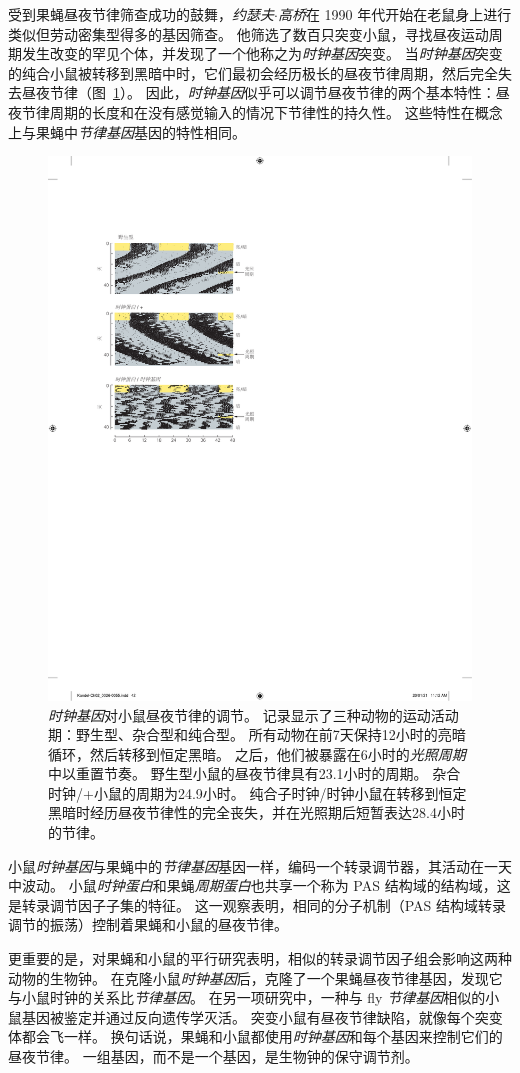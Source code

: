 受到果蝇昼夜节律筛查成功的鼓舞，\textit{约瑟夫$\cdot$高桥}在 1990 年代开始在老鼠身上进行类似但劳动密集型得多的基因筛查。
他筛选了数百只突变小鼠，寻找昼夜运动周期发生改变的罕见个体，并发现了一个他称之为\textit{时钟基因}突变。
当\textit{时钟基因}突变的纯合小鼠被转移到黑暗中时，它们最初会经历极长的昼夜节律周期，然后完全失去昼夜节律（图~\ref{fig:2_12}）。
因此，\textit{时钟基因}似乎可以调节昼夜节律的两个基本特性：昼夜节律周期的长度和在没有感觉输入的情况下节律性的持久性。
这些特性在概念上与果蝇中\textit{节律基因}基因的特性相同。


\begin{figure}[htbp]
	\centering
	\includegraphics[width=0.55\linewidth]{chap02/fig_2_12}
	\caption{\textit{时钟基因}对小鼠昼夜节律的调节。
		记录显示了三种动物的运动活动期：野生型、杂合型和纯合型。
		所有动物在前7天保持12小时的亮暗循环，然后转移到恒定黑暗。
		之后，他们被暴露在6小时的\textit{光照周期}中以重置节奏。
		野生型小鼠的昼夜节律具有23.1小时的周期。
		杂合时钟/+小鼠的周期为24.9小时。
		纯合子时钟/时钟小鼠在转移到恒定黑暗时经历昼夜节律性的完全丧失，并在光照期后短暂表达28.4小时的节律\cite{takahashi1994forward}。}
	\label{fig:2_12}
\end{figure}


小鼠\textit{时钟基因}与果蝇中的\textit{节律基因}基因一样，编码一个转录调节器，其活动在一天中波动。
小鼠\textit{时钟蛋白}和果蝇\textit{周期蛋白}也共享一个称为 PAS 结构域的结构域，这是转录调节因子子集的特征。
这一观察表明，相同的分子机制（PAS 结构域转录调节的振荡）控制着果蝇和小鼠的昼夜节律。


更重要的是，对果蝇和小鼠的平行研究表明，相似的转录调节因子组会影响这两种动物的生物钟。
在克隆小鼠\textit{时钟基因}后，克隆了一个果蝇昼夜节律基因，发现它与小鼠时钟的关系比\textit{节律基因}。
在另一项研究中，一种与 fly \textit{节律基因}相似的小鼠基因被鉴定并通过反向遗传学灭活。
突变小鼠有昼夜节律缺陷，就像每个突变体都会飞一样。 
换句话说，果蝇和小鼠都使用\textit{时钟基因}和每个基因来控制它们的昼夜节律。
一组基因，而不是一个基因，是生物钟的保守调节剂。


